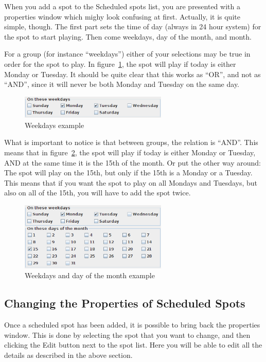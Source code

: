 \documentclass[a4paper,12pt]{report}
\begin{document}
When you add a spot to the Scheduled spots list, you are presented with a
properties window which mighy look confusing at first. Actually, it is quite
simple, though. The first part sets the time of day (always in 24 hour system)
for the spot to start playing. Then come weekdays, day of the month, and month.

For a group (for instance ``weekdays'') either of your selections may be true in
order for the spot to play. In figure~\ref{scheduledspotexample1}, the spot will
play if today is either Monday or Tuesday. It should be quite clear that this
works as ``OR'', and not as ``AND'', since it will never be both Monday and
Tuesday on the same day.

\begin{figure}[h]
\centering \includegraphics[width=70mm]{scheduledspotexample1.png}
\caption{Weekdays example}
\label{scheduledspotexample1}
\end{figure}

What is important to notice is that between groups, the relation is ``AND''.
This means that in figure~\ref{scheduledspotexample2}, the spot will play if
today is either Monday or Tuesday, AND at the same time it is the 15th of the
month. Or put the other way around: The spot will play on the 15th, but only if
the 15th is a Monday or a Tuesday. This means that if you want the spot to play
on all Mondays and Tuesdays, but also on all of the 15th, you will have to add
the spot twice.

\begin{figure}[h]
\centering \includegraphics[width=70mm]{scheduledspotexample2.png}
\caption{Weekdays and day of the month example}
\label{scheduledspotexample2}
\end{figure}

\subsection{Changing the Properties of Scheduled Spots}
Once a scheduled spot has been added, it is possible to bring back the
properties window. This is done by selecting the spot that you want to change,
and then clicking the Edit button next to the spot list. Here you will be able
to edit all the details as described in the above section.
\end{document}
